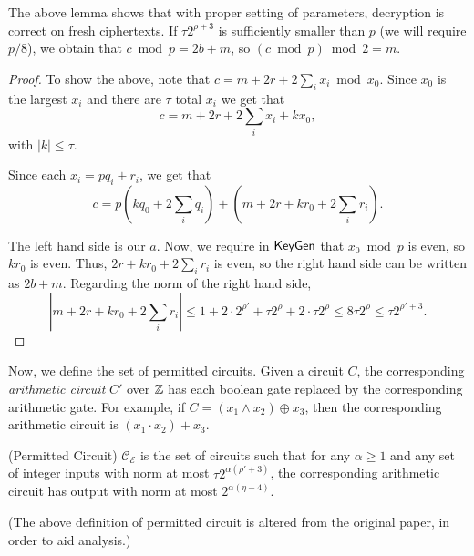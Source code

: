 The above lemma shows that with proper setting of parameters, decryption is correct on fresh ciphertexts. If $\tau 2^{\rho + 3}$ is sufficiently smaller than $p$ (we will require $p/8$), we obtain that $c \bmod p = 2b+m$, so $(c \bmod p) \bmod 2 = m$.
\begin{proof}
To show the above, note that $c = m + 2r + 2\sum_i x_i \bmod x_0$. Since $x_0$ is the largest $x_i$ and there are $\tau$ total $x_i$ we get that
\[c = m + 2r + 2\sum_i x_i + kx_0,\]
with $|k| \leq \tau$.

Since each $x_i = pq_i + r_i$, we get that
\[c = p(kq_0 + 2\sum_i q_i) + (m + 2r + kr_0 + 2\sum_i r_i).\]

The left hand side is our $a$. Now, we require in ${\sf KeyGen}$ that $x_0 \bmod p$ is even, so $kr_0$ is even. Thus, $2r + kr_0 + 2\sum_i r_i$ is even, so the right hand side can be written as $2b+m$. Regarding the norm of the right hand side,
\[|m + 2r + kr_0 + 2\sum_i r_i| \leq 1 + 2\cdot 2^{\rho'} + \tau 2^\rho + 2 \cdot \tau 2^\rho \leq 8\tau2^\rho \leq \tau2^{\rho' + 3}. \]
\end{proof}


Now, we define the set of permitted circuits. Given a circuit $C$, the corresponding \emph{arithmetic circuit} $C'$ over $\mathbb{Z}$ has each boolean gate replaced by the corresponding arithmetic gate. For example, if $C = (x_1 \wedge x_2) \oplus x_3$, then the corresponding arithmetic circuit is $(x_1 \cdot x_2) + x_3$.



\begin{definition} (Permitted Circuit) \label{def:permcircuit}
$\mathcal{C}_\mathcal{E}$ is the set of circuits such that for any $\alpha \geq 1$ and any set of integer inputs with norm at most $\tau 2^{\alpha(\rho' + 3)}$, the corresponding arithmetic circuit has output with norm at most $2^{\alpha(\eta - 4)}.$
\end{definition}

(The above definition of permitted circuit is altered from the original paper, in order to aid analysis.)


